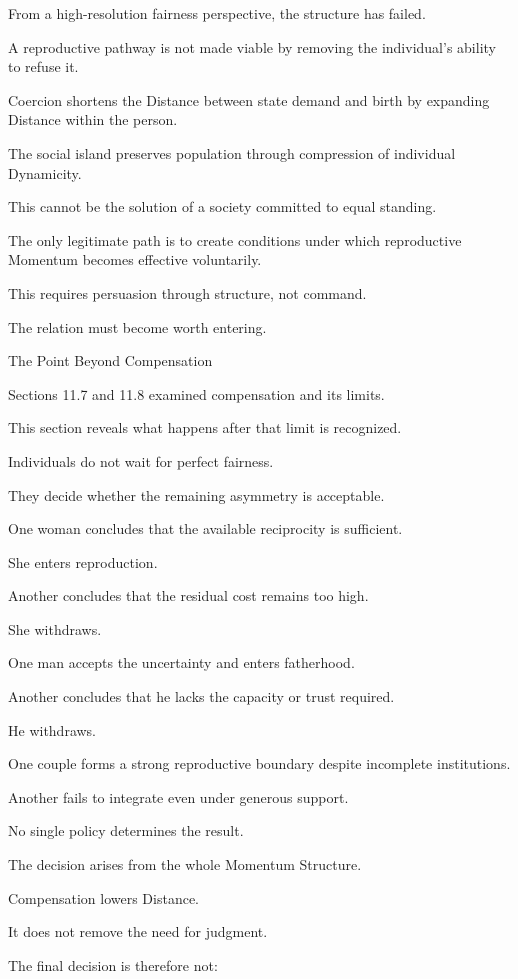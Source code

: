 From a high-resolution fairness perspective, the structure has failed.

A reproductive pathway is not made viable by removing the individual’s ability to refuse it.

Coercion shortens the Distance between state demand and birth by expanding Distance within the person.

The social island preserves population through compression of individual Dynamicity.

This cannot be the solution of a society committed to equal standing.

The only legitimate path is to create conditions under which reproductive Momentum becomes effective voluntarily.

This requires persuasion through structure, not command.

The relation must become worth entering.

The Point Beyond Compensation

Sections 11.7 and 11.8 examined compensation and its limits.

This section reveals what happens after that limit is recognized.

Individuals do not wait for perfect fairness.

They decide whether the remaining asymmetry is acceptable.

One woman concludes that the available reciprocity is sufficient.

She enters reproduction.

Another concludes that the residual cost remains too high.

She withdraws.

One man accepts the uncertainty and enters fatherhood.

Another concludes that he lacks the capacity or trust required.

He withdraws.

One couple forms a strong reproductive boundary despite incomplete institutions.

Another fails to integrate even under generous support.

No single policy determines the result.

The decision arises from the whole Momentum Structure.

Compensation lowers Distance.

It does not remove the need for judgment.

The final decision is therefore not:

